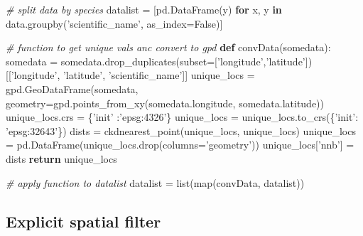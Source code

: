 \documentclass[]{article}
\newenvironment{Shaded}{}{}
\newcommand{\BuiltInTok}[1]{#1}
\newcommand{\CommentTok}[1]{\textcolor[rgb]{0.38,0.63,0.69}{\textit{#1}}}
\newcommand{\ControlFlowTok}[1]{\textcolor[rgb]{0.00,0.44,0.13}{\textbf{#1}}}
\newcommand{\KeywordTok}[1]{\textcolor[rgb]{0.00,0.44,0.13}{\textbf{#1}}}
\newcommand{\NormalTok}[1]{#1}
\newcommand{\OperatorTok}[1]{\textcolor[rgb]{0.40,0.40,0.40}{#1}}
\newcommand{\StringTok}[1]{\textcolor[rgb]{0.25,0.44,0.63}{#1}}
\newcommand{\VariableTok}[1]{\textcolor[rgb]{0.10,0.09,0.49}{#1}}
\begin{document}
\begin{Shaded}
\begin{Highlighting}[]
\CommentTok{# split data by species}
\NormalTok{datalist }\OperatorTok{=}\NormalTok{ [pd.DataFrame(y) }\ControlFlowTok{for}\NormalTok{ x, y }\KeywordTok{in}\NormalTok{ data.groupby(}\StringTok{'scientific_name'}\NormalTok{, as_index}\OperatorTok{=}\VariableTok{False}\NormalTok{)]}


\CommentTok{# function to get unique vals anc convert to gpd}
\KeywordTok{def}\NormalTok{ convData(somedata):}
\NormalTok{    somedata }\OperatorTok{=}\NormalTok{ somedata.drop_duplicates(subset}\OperatorTok{=}\NormalTok{[}\StringTok{'longitude'}\NormalTok{,}\StringTok{'latitude'}\NormalTok{])[[}\StringTok{'longitude'}\NormalTok{, }\StringTok{'latitude'}\NormalTok{, }\StringTok{'scientific_name'}\NormalTok{]]}
\NormalTok{    unique_locs }\OperatorTok{=}\NormalTok{ gpd.GeoDataFrame(somedata,}
\NormalTok{                                  geometry}\OperatorTok{=}\NormalTok{gpd.points_from_xy(somedata.longitude, }
\NormalTok{                                  somedata.latitude))}
\NormalTok{    unique_locs.crs }\OperatorTok{=}\NormalTok{ \{}\StringTok{'init'}\NormalTok{ :}\StringTok{'epsg:4326'}\NormalTok{\}}
\NormalTok{    unique_locs }\OperatorTok{=}\NormalTok{ unique_locs.to_crs(\{}\StringTok{'init'}\NormalTok{: }\StringTok{'epsg:32643'}\NormalTok{\})}
\NormalTok{    dists }\OperatorTok{=}\NormalTok{ ckdnearest_point(unique_locs, unique_locs)}
\NormalTok{    unique_locs }\OperatorTok{=}\NormalTok{ pd.DataFrame(unique_locs.drop(columns}\OperatorTok{=}\StringTok{'geometry'}\NormalTok{))}
\NormalTok{    unique_locs[}\StringTok{'nnb'}\NormalTok{] }\OperatorTok{=}\NormalTok{ dists}
    \ControlFlowTok{return}\NormalTok{ unique_locs}


\CommentTok{# apply function to datalist}
\NormalTok{datalist }\OperatorTok{=} \BuiltInTok{list}\NormalTok{(}\BuiltInTok{map}\NormalTok{(convData, datalist))}
\end{Highlighting}
\end{Shaded}

\hypertarget{explicit-spatial-filter}{%
\subsection{Explicit spatial filter}\label{explicit-spatial-filter}}
\end{document}
